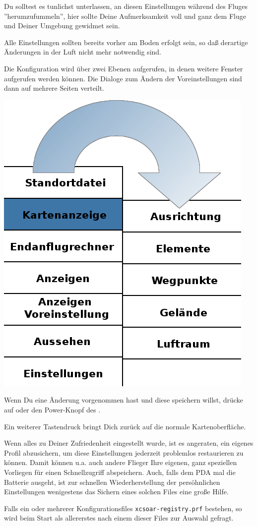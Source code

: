 Du solltest es tunlichst unterlassen, an diesen Einstellungen während des Fluges
''herumzufummeln'', hier sollte Deine Aufmerksamkeit voll und ganz dem Fluge und
Deiner Umgebung gewidmet sein. \warning

 Alle Einstellungen sollten bereits vorher am Boden erfolgt sein, so daß derartige
Änderungen in der Luft nicht mehr notwendig sind.

Die Konfiguration wird über zwei Ebenen aufgerufen, in denen weitere Fenster aufgerufen werden können.
Die Dialoge zum Ändern  der Voreinstellungen sind dann auf mehrere Seiten verteilt.

\begin{center}
\includegraphics[angle=0,width=0.5\linewidth,keepaspectratio='true']{figures/config-menu.png}
\end{center}

Wenn Du eine Änderung vorgenommen hast und diese speichern willst, drücke auf  oder
den Power-Knopf des \al .

Ein weiterer Tastendruck bringt Dich zurück auf die normale Kartenoberfläche.

\tip Wenn alles zu Deiner Zufriedenheit eingestellt wurde, ist es angeraten, ein eigenes Profil
abzusichern, um diese Einstellungen jederzeit problemlos restaurieren zu können. Damit können u.a. auch
andere Flieger Ihre eigenen, ganz speziellen Vorliegen für einen Schnellzugriff abspeichern.
Auch, falls dem PDA mal  die Batterie ausgeht, ist zur schnellen Wiederherstellung der persöhnlichen
Einstellungen wenigestens das Sichern eines solchen Files eine große Hilfe.

Falls ein oder mehrerer Konfigurationsfiles \verb"xcsoar-registry.prf"  bestehen, so wird beim Start als allererstes nach
einem dieser Files zur Auswahl gefragt.

